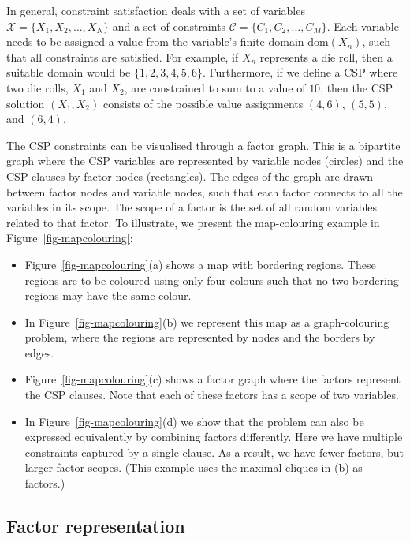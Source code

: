 \documentclass{ieeeaccess}
\begin{document}
In general, constraint satisfaction deals with a set of variables $\mathcal{X} = \{X_1, X_2, \ldots, X_N\}$ and a set of constraints $\mathcal{C} = \{C_1, C_2, \ldots, C_M\}$. Each variable needs to be assigned a value from the variable's finite domain $\text{dom}(X_n)$, such that all constraints are satisfied. For example, if $X_n$ represents a die roll, then a suitable domain would be $\{1,2,3,4,5,6\}$. Furthermore, if we define a CSP where two die rolls, $X_1$ and $X_2$, are constrained to sum to a value of $10$, then the CSP solution $(X_1, X_2)$ consists of the possible value assignments $(4,6)$, $(5,5)$, and $(6,4)$.

The CSP constraints can be visualised through a factor graph. This is a bipartite graph where the CSP variables are represented by variable nodes (circles) and the CSP clauses by factor nodes (rectangles). The edges of the graph are drawn between factor nodes and variable nodes, such that each factor connects to all the variables in its scope. The scope of a factor is the set of all random variables related to that factor. To illustrate, we present the map-colouring example in Figure~\ref{fig-mapcolouring}:
\begin{itemize}
	
	\item
	Figure~\ref{fig-mapcolouring}(a) shows a map with bordering regions. These regions are to be coloured using only four colours such that no two bordering regions may have the same colour.
	
	\item
	In Figure~\ref{fig-mapcolouring}(b) we represent this map as a graph-colouring problem, where the regions are represented by nodes and the borders by edges.
	
	\item
	Figure~\ref{fig-mapcolouring}(c) shows a factor graph where the factors represent the CSP clauses. Note that each of these factors has a scope of two variables.
	
	\item
	In Figure~\ref{fig-mapcolouring}(d) we show that the problem can also be expressed equivalently by combining factors differently. Here we have multiple constraints captured by a single clause. As a result, we have fewer factors, but larger factor scopes. (This example uses the maximal cliques in (b) as factors.)
	
\end{itemize}

\subsection{Factor representation}
\end{document}

